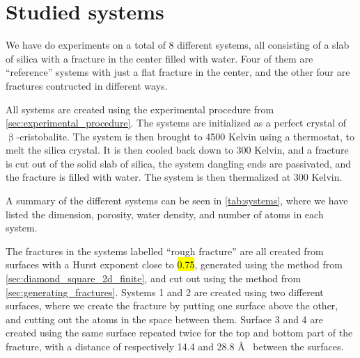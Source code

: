 \chapter{Studied systems}
%
%
%
We have do experiments on a total of 8 different systems, all consisting of a slab of silica with a fracture in the center filled with water. Four of them are ``reference'' systems with just a flat fracture in the center, and the other four are fractures contructed in different ways.

All systems are created using the experimental procedure from \cref{sec:experimental_procedure}. The systems are initialized as a perfect crystal of $\upbeta$-cristobalite. The system is then brought to 4500 Kelvin using a thermostat, to melt the silica crystal. It is then cooled back down to 300 Kelvin, and a fracture is cut out of the solid slab of silica, the system dangling ends are passivated, and the fracture is filled with water. The system is then thermalized at 300 Kelvin.

A summary of the different systems can be seen in \cref{tab:systems}, where we have listed the dimension, porosity, water density, and number of atoms in each system.

The fractures in the systems labelled ``rough fracture'' are all created from surfaces with a Hurst exponent close to \hl{0.75}, generated using the method from \cref{sec:diamond_square_2d_finite}, and cut out using the method from \cref{sec:generating_fractures}. Systems 1 and 2 are created using two different surfaces, where we create the fracture by putting one surface above the other, and cutting out the atoms in the space between them. Surface 3 and 4 are created using the same surface repeated twice for the top and bottom part of the fracture, with a distance of respectively 14.4 and 28.8 \AA~ between the surfaces.

